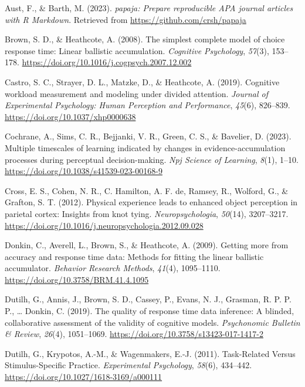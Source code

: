 \documentclass[
  man, donotrepeattitle,floatsintext]{apa6}
\newlength{\cslhangindent}
\newenvironment{CSLReferences}[2] %
 {\begin{list}{}{%
  \setlength{\itemindent}{0pt}
  \setlength{\leftmargin}{0pt}
  \setlength{\parsep}{0pt}
  \ifodd #1
   \setlength{\leftmargin}{\cslhangindent}
   \setlength{\itemindent}{-1\cslhangindent}
  \fi
  \setlength{\itemsep}{#2\baselineskip}}}
 {\end{list}}
\begin{document}
\label{refs}
\begin{CSLReferences}{1}{0}
Aust, F., \& Barth, M. (2023). \emph{{papaja}: {Prepare} reproducible {APA} journal articles with {R Markdown}}. Retrieved from \url{https://github.com/crsh/papaja}

Brown, S. D., \& Heathcote, A. (2008). The simplest complete model of choice response time: {Linear} ballistic accumulation. \emph{Cognitive Psychology}, \emph{57}(3), 153--178. \url{https://doi.org/10.1016/j.cogpsych.2007.12.002}

Castro, S. C., Strayer, D. L., Matzke, D., \& Heathcote, A. (2019). Cognitive workload measurement and modeling under divided attention. \emph{Journal of Experimental Psychology: Human Perception and Performance}, \emph{45}(6), 826--839. \url{https://doi.org/10.1037/xhp0000638}

Cochrane, A., Sims, C. R., Bejjanki, V. R., Green, C. S., \& Bavelier, D. (2023). Multiple timescales of learning indicated by changes in evidence-accumulation processes during perceptual decision-making. \emph{Npj Science of Learning}, \emph{8}(1), 1--10. \url{https://doi.org/10.1038/s41539-023-00168-9}

Cross, E. S., Cohen, N. R., C. Hamilton, A. F. de, Ramsey, R., Wolford, G., \& Grafton, S. T. (2012). Physical experience leads to enhanced object perception in parietal cortex: {Insights} from knot tying. \emph{Neuropsychologia}, \emph{50}(14), 3207--3217. \url{https://doi.org/10.1016/j.neuropsychologia.2012.09.028}

Donkin, C., Averell, L., Brown, S., \& Heathcote, A. (2009). Getting more from accuracy and response time data: {Methods} for fitting the linear ballistic accumulator. \emph{Behavior Research Methods}, \emph{41}(4), 1095--1110. \url{https://doi.org/10.3758/BRM.41.4.1095}

Dutilh, G., Annis, J., Brown, S. D., Cassey, P., Evans, N. J., Grasman, R. P. P. P., \ldots{} Donkin, C. (2019). The quality of response time data inference: A blinded, collaborative assessment of the validity of cognitive models. \emph{Psychonomic Bulletin \& Review}, \emph{26}(4), 1051--1069. \url{https://doi.org/10.3758/s13423-017-1417-2}

Dutilh, G., Krypotos, A.-M., \& Wagenmakers, E.-J. (2011). Task-{Related Versus Stimulus-Specific Practice}. \emph{Experimental Psychology}, \emph{58}(6), 434--442. \url{https://doi.org/10.1027/1618-3169/a000111}


\end{CSLReferences}
\end{document}

